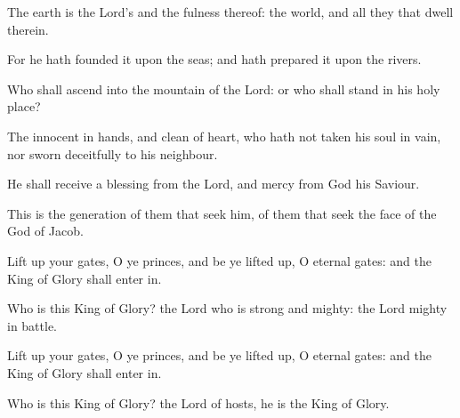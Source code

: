 \item The earth is the Lord’s and the fulness thereof: the world, and all they that dwell therein.
\item For he hath founded it upon the seas; and hath prepared it upon the rivers.
\item Who shall ascend into the mountain of the Lord: or who shall stand in his holy place?
\item The innocent in hands, and clean of heart, who hath not taken his soul in vain, nor sworn deceitfully to his neighbour.
\item He shall receive a blessing from the Lord, and mercy from God his Saviour.
\item This is the generation of them that seek him, of them that seek the face of the God of Jacob.
\item Lift up your gates, O ye princes, and be ye lifted up, O eternal gates: and the King of Glory shall enter in.
\item Who is this King of Glory? the Lord who is strong and mighty: the Lord mighty in battle.
\item Lift up your gates, O ye princes, and be ye lifted up, O eternal gates: and the King of Glory shall enter in.
\item Who is this King of Glory? the Lord of hosts, he is the King of Glory.
